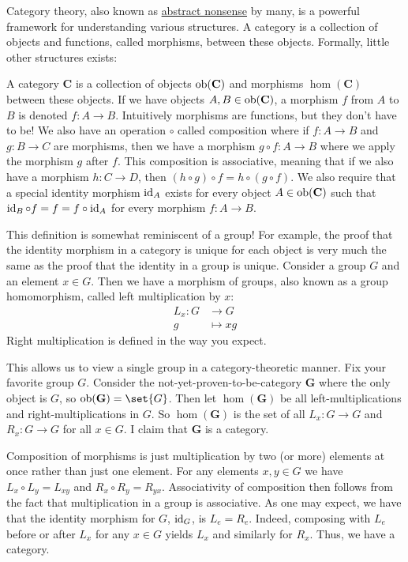 \documentclass{article}
\begin{document}
Category theory, also known as \href{https://en.wikipedia.org/wiki/Abstract_nonsense\#History}{abstract nonsense} by many, is a powerful framework for understanding various structures.
A category is a collection of objects and functions, called morphisms, between these objects.
Formally, little other structures exists:
\begin{defn}\label{defn:cat}
  A category $\textbf{C}$ is a collection of objects $\operatorname{ob}(\textbf{C})$ and morphisms $\hom(\textbf{C})$ between these objects.
  If we have objects $A, B \in \operatorname{ob}(\textbf{C})$, a morphism $f$ from $A$ to $B$ is denoted $f\colon A \to B$.
  Intuitively morphisms are functions, but they don't have to be!
  We also have an operation $\circ$ called composition where if $f\colon A \to B$ and $g\colon B \to C$ are morphisms, then we have a morphism $g \circ f\colon A \to B$ where we apply the morphism $g$ after $f$.
  This composition is associative, meaning that if we also have a morphism $h\colon C \to D$, then $(h \circ g) \circ f = h \circ (g \circ f)$.
  We also require that a special identity morphism $\operatorname{id}_{A}$ exists for every object $A \in \operatorname{ob}(\textbf{C})$ such that $\operatorname{id}_{B} \circ f = f = f \circ \operatorname{id}_{A}$ for every morphism $f\colon A \to B$.
\end{defn}

This definition is somewhat reminiscent of a group!
For example, the proof that the identity morphism in a category is unique for each object is very much the same as the proof that the identity in a group is unique.
Consider a group $G$ and an element $x \in G$.
Then we have a morphism of groups, also known as a group homomorphism, called left multiplication by $x$:
\begin{align*}
  L_{x}\colon G &\to G \\
              g &\mapsto xg
\end{align*}
Right multiplication is defined in the way you expect.

This allows us to view a single group in a category-theoretic manner.
Fix your favorite group $G$.
Consider the not-yet-proven-to-be-category $\textbf{G}$ where the only object is $G$, so $\ob(\textbf{G}) = \set{G}$.
Then let $\hom(\textbf{G})$ be all left-multiplications and right-multiplications in $G$.
So $\hom(\textbf{G})$ is the set of all $L_{x}\colon G \to G$ and $R_{x}\colon G \to G$ for all $x \in G$.
I claim that $\textbf{G}$ is a category.

Composition of morphisms is just multiplication by two (or more) elements at once rather than just one element.
For any elements $x, y \in G$ we have $L_{x} \circ L_{y} = L_{xy}$ and $R_{x} \circ R_{y} = R_{yx}$.
Associativity of composition then follows from the fact that multiplication in a group is associative.
As one may expect, we have that the identity morphism for $G$, $\operatorname{id}_{G}$, is $L_{e} = R_{e}$.
Indeed, composing with $L_{e}$ before or after $L_{x}$ for any $x \in G$ yields $L_{x}$ and similarly for $R_{x}$.
Thus, we have a category.
\end{document}

